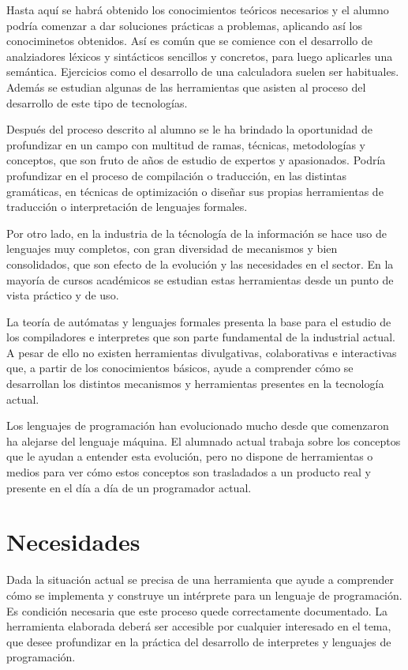 Hasta aquí se habrá obtenido los conocimientos teóricos necesarios y el alumno podría comenzar a dar soluciones prácticas a problemas, aplicando así los conociminetos obtenidos. Así es
común que se comience con el desarrollo de analziadores léxicos y sintácticos sencillos y concretos, para luego aplicarles una semántica. Ejercicios como el desarrollo de 
una calculadora suelen ser habituales. Además se estudian algunas de las herramientas que asisten al proceso del desarrollo de este tipo de tecnologías.

Después del proceso descrito al alumno se le ha brindado la oportunidad de profundizar en un campo con multitud de ramas, técnicas, metodologías y conceptos, que son fruto de años de 
estudio de expertos y apasionados. Podría profundizar en el proceso de compilación o traducción, en las distintas gramáticas, en técnicas de optimización o diseñar sus propias herramientas 
de traducción o interpretación de lenguajes formales.

Por otro lado, en la industria de la técnología de la información se hace uso de lenguajes muy completos, con gran diversidad de mecanismos y bien consolidados, que son efecto de la evolución 
y las necesidades en el sector. En la mayoría de cursos académicos se estudian estas herramientas desde un punto de vista práctico y de uso. 

La teoría de autómatas y lenguajes formales presenta la base para el estudio de los compiladores e interpretes que son parte fundamental de la industrial 
actual. A pesar de ello no existen herramientas divulgativas, colaborativas e interactivas que, a partir de los conocimientos básicos, ayude a comprender cómo se desarrollan los distintos 
mecanismos y herramientas presentes en la tecnología actual.

Los lenguajes de programación han evolucionado mucho desde que comenzaron ha alejarse del lenguaje máquina. El alumnado actual trabaja sobre los conceptos que le ayudan a entender esta evolución, 
pero no dispone de herramientas o medios para ver cómo estos conceptos son trasladados a un producto real y presente en el día a día de un programador actual. 

\section{Necesidades}
Dada la situación actual se precisa de una herramienta que ayude a comprender cómo se implementa y construye un intérprete para un lenguaje de programación. Es condición necesaria que 
este proceso quede correctamente documentado. La herramienta elaborada deberá ser accesible por cualquier interesado en el tema, que desee profundizar en la práctica del desarrollo
de interpretes y lenguajes de programación. 

